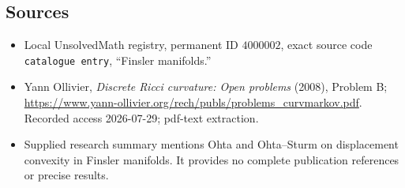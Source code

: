 \documentclass[11pt]{article}
\begin{document}
\subsection{Sources}
\begin{itemize}
\item Local UnsolvedMath registry, permanent ID \(4000002\), exact source code \texttt{catalogue entry}, ``Finsler manifolds.''
\item Yann Ollivier, \emph{Discrete Ricci curvature: Open problems} (2008), Problem B; \url{https://www.yann-ollivier.org/rech/publs/problems_curvmarkov.pdf}. Recorded access 2026-07-29; pdf-text extraction.
\item Supplied research summary mentions Ohta and Ohta--Sturm on displacement convexity in Finsler manifolds. It provides no complete publication references or precise results.
\end{itemize}
\end{document}
